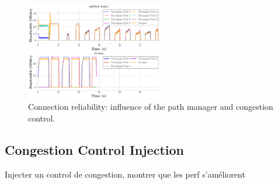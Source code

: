 \begin{figure}[!t]
  \begin{center}
    \includegraphics[width=6cm]{figures/tcpls_mptcp.png}
  \end{center}
  \caption{Connection reliability: influence of the path manager and congestion
  control.}
\end{figure}



\subsection{Congestion Control Injection}

Injecter un control de congestion, montrer que les perf s'améliorent
